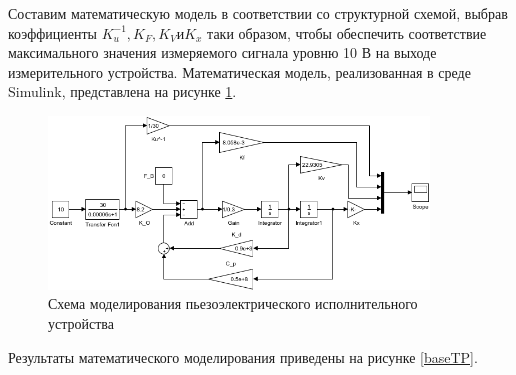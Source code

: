 \documentclass[fleqn, a4paper, 11pt, russian]{article}
\begin{document}
	Составим математическую модель в соответствии со структурной схемой, выбрав коэффициенты $K_u^{-1}, K_F, K_V \text{и} K_x$ таки образом, чтобы обеспечить соответствие максимального значения измеряемого сигнала уровню 10 В на выходе измерительного устройства.	Математическая модель, реализованная в среде Simulink, представлена на рисунке \ref{model}.
	\begin{figure}[ht!]
		\centering
		\includegraphics[width = 0.9\textwidth]{Model/mathModel}
		\caption{Схема моделирования пьезоэлектрического исполнительного устройства}
		\label{model}
	\end{figure}
	\newpage
	Результаты математического моделирования приведены на рисунке \ref{baseTP}.
\end{document}
